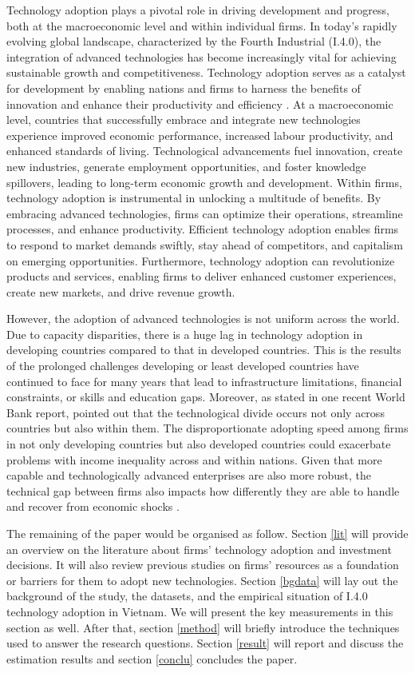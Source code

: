 \documentclass[a4paper,11pt]{article}
\begin{document}
Technology adoption plays a pivotal role in driving development and progress, both at the macroeconomic level and within individual firms. In today's rapidly evolving global landscape, characterized by the Fourth Industrial (I.4.0), the integration of advanced technologies has become increasingly vital for achieving sustainable growth and competitiveness. Technology adoption serves as a catalyst for development by enabling nations and firms to harness the benefits of innovation and enhance their productivity and efficiency \citep{united2018world}. At a macroeconomic level, countries that successfully embrace and integrate new technologies experience improved economic performance, increased labour productivity, and enhanced standards of living. Technological advancements fuel innovation, create new industries, generate employment opportunities, and foster knowledge spillovers, leading to long-term economic growth and development. Within firms, technology adoption is instrumental in unlocking a multitude of benefits. By embracing advanced technologies, firms can optimize their operations, streamline processes, and enhance productivity. Efficient technology adoption enables firms to respond to market demands swiftly, stay ahead of competitors, and capitalism on emerging opportunities. Furthermore, technology adoption can revolutionize products and services, enabling firms to deliver enhanced customer experiences, create new markets, and drive revenue growth.

However, the adoption of advanced technologies is not uniform across the world. Due to capacity disparities, there is a huge lag in technology adoption in developing countries compared to that in developed countries. This is the results of the prolonged challenges developing or least developed countries have continued to face for many years that lead to infrastructure limitations, financial constraints, or skills and education gaps. Moreover, as stated in one recent World Bank report, \cite{cirera2022bridging} pointed out that the technological divide occurs not only across countries but also within them. The disproportionate adopting speed among firms in not only developing countries but also developed countries could exacerbate problems with income inequality across and within nations. Given that more capable and technologically advanced enterprises are also more robust, the technical gap between firms also impacts how differently they are able to handle and recover from economic shocks \citep{cirera2022bridging}.

The remaining of the paper would be organised as follow. Section \ref{lit} will provide an overview on the literature about firms' technology adoption and investment decisions. It will also review previous studies on firms' resources as a foundation or barriers for them to adopt new technologies. Section \ref{bgdata} will lay out the background of the study, the datasets, and the empirical situation of I.4.0 technology adoption in Vietnam. We will present the key measurements in this section as well. After that, section \ref{method} will briefly introduce the techniques used to answer the research questions. Section \ref{result} will report and discuss the estimation results and section \ref{conclu} concludes the paper.
\end{document}
